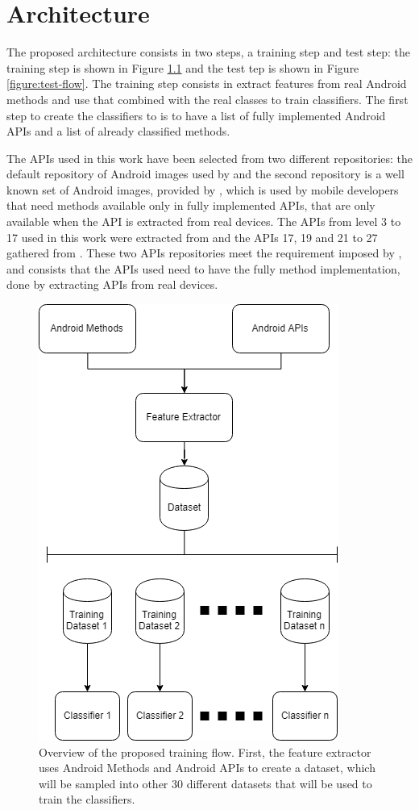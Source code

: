 \chapter{Architecture}\label{chapter:architecture}

The proposed architecture consists in two steps, a training step and test step: the training step is shown in Figure \ref{figure:train-flow} and the test tep is shown in Figure \ref{figure:test-flow}. The training step consists in extract features from real Android methods and use that combined with the real classes to train classifiers. The first step to create the classifiers to is to have a list of fully implemented Android APIs and a list of already classified methods.

The APIs used in this work have been selected from two different repositories: the default repository of Android images used by \cite{rasthofer2014machine} and the second repository is a well known set of Android images, provided by \cite{hiddenapi}, which is used by mobile developers that need methods available only in fully implemented APIs, that are only available when the API is extracted from real devices. The APIs from level 3 to 17 used in this work were extracted from \cite{rasthofer2014api} and the APIs 17, 19 and 21 to 27 gathered from \cite{hiddenapi}. These two APIs repositories meet the requirement imposed by \cite{rasthofer2014machine}, and consists that the APIs used need to have the fully method implementation, done by extracting APIs from real devices.

\begin{figure}[!h]
    \begin{center}
        \includegraphics[width=0.5\linewidth]{images/architectures-training.png}
    \end{center}
    \caption{%
        Overview of the proposed training flow. First, the feature extractor uses Android Methods and %
        Android APIs to create a dataset, which will be sampled into other 30 different datasets that will be used %
        to train the classifiers.%
    }\label{figure:train-flow}
    \vspace{4ex}
\end{figure}

